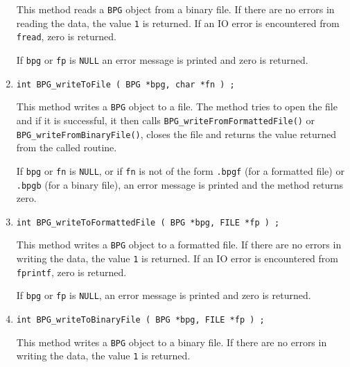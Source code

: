 \begin{enumerate}
\par
This method reads a {\tt BPG} object from a binary file.
If there are no errors in reading the data, 
the value {\tt 1} is returned.
If an IO error is encountered from {\tt fread}, zero is returned.
\par {}
If {\tt bpg} or {\tt fp} is {\tt NULL} 
an error message is printed and zero is returned.
\item
\begin{verbatim}
int BPG_writeToFile ( BPG *bpg, char *fn ) ;
\end{verbatim}
\par
This method writes a {\tt BPG} object to a file.
The method tries to open the file and if it is successful, 
it then calls {\tt BPG\_writeFromFormattedFile()} or
{\tt BPG\_writeFromBinaryFile()},
closes the file
and returns the value returned from the called routine.
\par {}
If {\tt bpg} or {\tt fn} is {\tt NULL}, 
or if {\tt fn} is not of the form
{\tt *.bpgf} (for a formatted file) 
or {\tt *.bpgb} (for a binary file),
an error message is printed and the method returns zero.
\item
\begin{verbatim}
int BPG_writeToFormattedFile ( BPG *bpg, FILE *fp ) ;
\end{verbatim}
\par
This method writes a {\tt BPG} object to a formatted file.
If there are no errors in writing the data, 
the value {\tt 1} is returned.
If an IO error is encountered from {\tt fprintf}, zero is returned.
\par {}
If {\tt bpg} or {\tt fp} is {\tt NULL},
an error message is printed and zero is returned.
\item
\begin{verbatim}
int BPG_writeToBinaryFile ( BPG *bpg, FILE *fp ) ;
\end{verbatim}
\par
This method writes a {\tt BPG} object to a binary file.
If there are no errors in writing the data, 
the value {\tt 1} is returned.

\end{enumerate}
